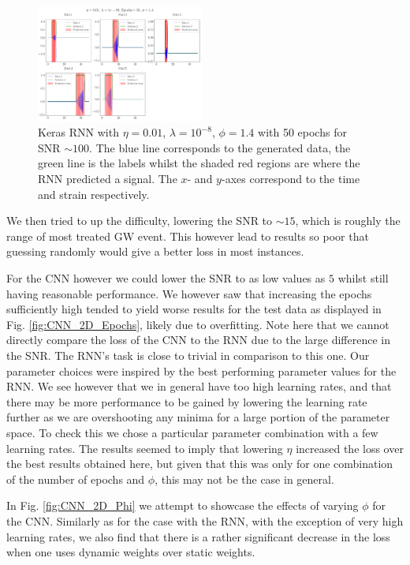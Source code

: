 \documentclass[%
reprint,
amsmath,amssymb,
aps,
]{revtex4-2}
\begin{document}
\begin{figure}[H]
	\includegraphics[width=0.49\textwidth]{Figures/BestPrediction_Epochs50_Phi1.4.pdf}
	\caption{Keras RNN with $\eta=0.01$, $\lambda=10^{-8}$, $\phi=1.4$ with 50 epochs for SNR $\sim100$. The blue line corresponds to the generated data, the green line is the labels whilst the shaded red regions are where the RNN predicted a signal. The $x$- and $y$-axes correspond to the time and strain respectively.}
	\label{fig:bestPred}
\end{figure}

We then tried to up the difficulty, lowering the SNR to $\sim15$, which is roughly the range of most treated GW event. This however lead to results so poor that guessing randomly would give a better loss in most instances.

For the CNN however we could lower the SNR to as low values as $5$ whilst still having reasonable performance. We however saw that increasing the epochs sufficiently high tended to yield worse results for the test data as displayed in Fig. \ref{fig:CNN_2D_Epochs}, likely due to overfitting. Note here that we cannot directly compare the loss of the CNN to the RNN due to the large difference in the SNR. The RNN's task is close to trivial in comparison to this one. Our parameter choices were inspired by the best performing parameter values for the RNN. We see however that we in general have too high learning rates, and that there may be more performance to be gained by lowering the learning rate further as we are overshooting any minima for a large portion of the parameter space. To check this we chose a particular parameter combination with a few learning rates. The results seemed to imply that lowering $\eta$ increased the loss over the best results obtained here, but given that this was only for one combination of the number of epochs and $\phi$, this may not be the case in general.

In Fig. \ref{fig:CNN_2D_Phi} we attempt to showcase the effects of varying $\phi$ for the CNN. Similarly as for the case with the RNN, with the exception of very high learning rates, we also find that there is a rather significant decrease in the loss when one uses dynamic weights over static weights. 
\end{document}
